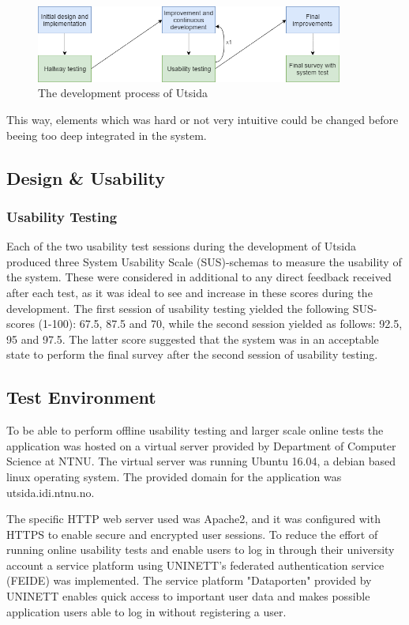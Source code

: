 \begin{figure}[h]
    \centering
    \includegraphics[width=0.9\textwidth]{fig/development_process.png}
    \caption{The development process of Utsida}
    \label{fig:development_process}
\end{figure}

This way, elements which was hard or not very intuitive could be changed before beeing too deep integrated in the system.


\subsection{Design \& Usability}

\subsubsection{Usability Testing}
Each of the two usability test sessions during the development of Utsida produced three System Usability Scale (SUS)-schemas to measure the usability of the system. These were considered in additional to any direct feedback received after each test, as it was ideal to see and increase in these scores during the development. The first session of usability testing yielded the following SUS-scores (1-100): 67.5, 87.5 and 70, while the second session yielded as follows: 92.5, 95 and 97.5. The latter score suggested that the system was in an acceptable state to perform the final survey after the second session of usability testing.

\subsection{Test Environment}
To be able to perform offline usability testing and larger scale online tests the application was hosted on a virtual server provided by Department of Computer Science at NTNU. The virtual server was running Ubuntu 16.04, a debian based linux operating system. The provided domain for the application was utsida.idi.ntnu.no.

The specific HTTP web server used was Apache2, and it was configured with HTTPS to enable secure and encrypted user sessions. To reduce the effort of running online usability tests and enable users to log in through their university account a service platform using UNINETT's federated authentication service (FEIDE) was implemented. The service platform "Dataporten"\cite{dataporten} provided by UNINETT enables quick access to important user data and makes possible application users able to log in without registering a user. 

